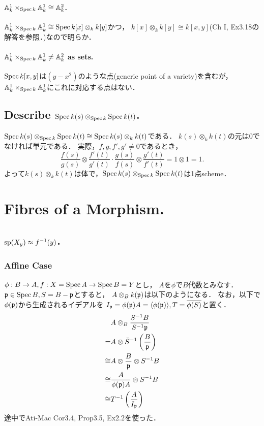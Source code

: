 \documentclass[a4paper]{jsarticle}
\newcommand{\basesp}{\operatorname{sp}}
\begin{document}
    \paragraph{$\mathbb{A}^1_k \times_{\operatorname{Spec} k} \mathbb{A}^1_k \cong \mathbb{A}^2_k$.}
    $\mathbb{A}^1_k \times_{\operatorname{Spec} k} \mathbb{A}^1_k \cong \operatorname{Spec} k[x] \otimes_k k[y]$かつ，
    $k[x] \otimes_k k[y] \cong k[x,y]$(Ch I, Ex3.18の解答を参照．)なので明らか．

    \paragraph{$\mathbb{A}^1_k \times_{\operatorname{Spec} k} \mathbb{A}^1_k \neq \mathbb{A}^2_k$ as sets.}
    $\operatorname{Spec} k[x,y]$は$(y-x^2)$のような点(generic point of a variety)を含むが，
    $\mathbb{A}^1_k \times_{\operatorname{Spec} k} \mathbb{A}^1_k$にこれに対応する点はない．

    \subsection{Describe $\operatorname{Spec} k(s) \otimes_{\operatorname{Spec} k} \operatorname{Spec} k(t)$.}
    $\operatorname{Spec} k(s) \otimes_{\operatorname{Spec} k} \operatorname{Spec} k(t) \cong \operatorname{Spec} k(s) \otimes_k k(t)$である．
    $k(s) \otimes_k k(t)$の元は$0$でなければ単元である．
    実際，$f,g,f',g' \neq 0$であるとき，
    \[ \frac{f(s)}{g(s)} \otimes \frac{f'(t)}{g'(t)} \cdot \frac{g(s)}{f(s)} \otimes \frac{g'(t)}{f'(t)}=1 \otimes 1=1. \]
    よって$k(s) \otimes_k k(t)$は体で，$\operatorname{Spec} k(s) \otimes_{\operatorname{Spec} k} \operatorname{Spec} k(t)$は1点scheme．

\section{Fibres of a Morphism.} %
\subsection{$\basesp(X_y) \homeo f^{-1}(y)$.}
    \subsubsection{Affine Case}
    $\phi: B \to A, f: X=\operatorname{Spec} A \to \operatorname{Spec} B=Y$とし，
    $A$を$\phi$で$B$代数とみなす．
    $\mathfrak{p} \in \operatorname{Spec} B, S=B-\mathfrak{p}$とすると，
    $A \otimes_B k(\mathfrak{p})$は以下のようになる．
    なお，以下で$\phi(\mathfrak{p})$から生成されるイデアルを
    $I_{\mathfrak{p}}=\phi(\mathfrak{p})A=\langle \phi(\mathfrak{p}) \rangle, T=\overline{\phi(S)}$と置く．
    \begin{align*}
        {}& A \otimes_B \frac{S^{-1}B}{S^{-1}\mathfrak{p}} \\
        =& A \otimes \bar{S}^{-1}\left( \frac{B}{\mathfrak{p}} \right) \\
        \cong& A \otimes \frac{B}{\mathfrak{p}} \otimes S^{-1}B \\
        \cong& \frac{A}{\phi(\mathfrak{p})A} \otimes S^{-1}B \\
        \cong& T^{-1}\left( \frac{A}{I_{\mathfrak{p}}} \right)
    \end{align*}
    途中でAti-Mac Cor3.4, Prop3.5, Ex2.2を使った．
\end{document}

